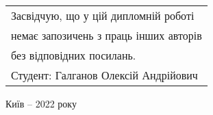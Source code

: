 \vspace{20mm}
\begin{flushright}
    \begin{tabular}{l@{}}
        Засвідчую, що у цій дипломній роботі\\
        немає запозичень з праць інших авторів\\
        без відповідних посилань.\\
        Студент: Галганов Олексій Андрійович
  \end{tabular}
\end{flushright}

\begin{center}
    \vspace{30mm}
    Київ -- 2022 року
\end{center}
\newpage